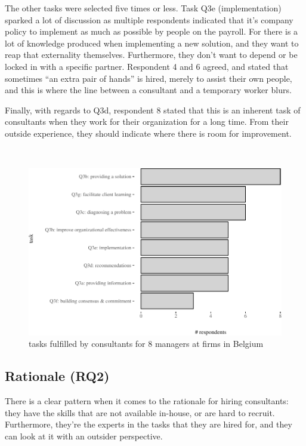 \documentclass[
  man,floatsintext]{apa6}
\begin{document}
The other tasks were selected five times or less. Task Q3e (implementation) sparked a lot of discussion as multiple respondents indicated that it's company policy to implement as much as possible by people on the payroll. For there is a lot of knowledge produced when implementing a new solution, and they want to reap that externality themselves. Furthermore, they don't want to depend or be locked in with a specific partner. Respondent 4 and 6 agreed, and stated that sometimes ``an extra pair of hands'' is hired, merely to assist their own people, and this is where the line between a consultant and a temporary worker blurs.

Finally, with regards to Q3d, respondent 8 stated that this is an inherent task of consultants when they work for their organization for a long time. From their outside experience, they should indicate where there is room for improvement.

\(~\)

\begin{figure}

{\centering \includegraphics[width=0.75\linewidth]{2_ams_five_pager_files/figure-latex/unnamed-chunk-4-1} 

}

\caption{tasks fulfilled by consultants for 8 managers at firms in Belgium}\label{fig:unnamed-chunk-4}
\end{figure}

\subsection{Rationale (RQ2)}\label{rationale-rq2}

There is a clear pattern when it comes to the rationale for hiring consultants: they have the skills that are not available in-house, or are hard to recruit. Furthermore, they're the experts in the tasks that they are hired for, and they can look at it with an outsider perspective.
\end{document}
